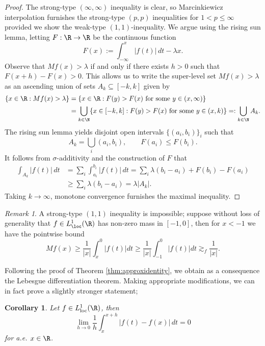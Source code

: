 \documentclass[reqno]{amsart}
\newtheorem{corollary}[theorem]{Corollary}
\theoremstyle{definition}
\theoremstyle{remark}
\newtheorem*{remark}{Remark}
\begin{document}
\begin{proof}
	The strong-type $(\infty, \infty)$ inequality is clear, so Marcinkiewicz interpolation furnishes the strong-type $(p, p)$ inequalities for $1 < p \leq \infty$ provided we show the weak-type $(1, 1)$-inequality. We argue using the rising sun lemma, letting $F: \R \to \R$ be the continuous function
		\[ F(x) := \int_{-\infty}^x |f(t)| \, dt - \lambda x. \]
	Observe that $Mf (x) > \lambda$ if and only if there exists $h > 0$ such that $F(x + h) - F(x) > 0$. This allows us to write the super-level set $Mf(x) > \lambda$ as an ascending union of sets $A_k \subseteq [-k, k]$ given by 
		\begin{align*}
			 \{ x \in \R : Mf(x) > \lambda \} 
			 	&= \{ x \in \R : F(y) > F(x) \text{ for some $y \in (x, \infty)$} \} \\
			 	&= \bigcup_{k \in \N} \{ x \in [-k, k] : F(y) > F(x) \text{ for some $y \in (x, k)$}\} =: \bigcup_{k \in \N} A_k. 
		\end{align*}	 
	The rising sun lemma yields disjoint open intervals $\{ (a_i, b_i) \}_i$ such that 
		\[ A_k = \bigcup_i (a_i, b_i), \qquad F(a_i) \leq F(b_i). \]
	It follows from $\sigma$-additivity and the construction of $F$ that
		\begin{align*}
			 \int_{A_k} |f(t)| \, dt 
			 	&= \sum_i \int_{a_i}^{b_i} |f(t)| \, dt = \sum_i \lambda (b_i - a_i) + F(b_i) - F(a_i) \\
			 	&\geq \sum_i \lambda (b_i - a_i) = \lambda |A_k|. 
		\end{align*}	 		
	Taking $k \to \infty$, monotone convergence furnishes the maximal inequality. 
\end{proof}

\begin{remark}
	A strong-type $(1, 1)$ inequality is impossible; suppose without loss of generality that $f \in L^1_{\loc} (\R)$ has non-zero mass in $[-1, 0]$, then for $x < -1$ we have the pointwise bound
		\[ M f(x) \geq \frac{1}{|x|} \int_x^0 |f(t)| dt \geq \frac{1}{|x|} \int_{-1}^0 |f(t)| dt \gtrsim_f \frac{1}{|x|}. \]
\end{remark}

Following the proof of Theorem \ref{thm:approxidentity}, we obtain as a consequence the Lebesgue differentiation theorem. Making appropriate modifications, we can in fact prove a slightly stronger statement;

\begin{corollary}
	Let $f \in L^1_{\text{loc}} (\R)$, then 
		\[ \lim_{h \to 0} \frac1h \int_x^{x + h} |f(t) - f(x)| \, dt = 0  \]
	for a.e. $x \in \R$. 	
\end{corollary}
\end{document}
